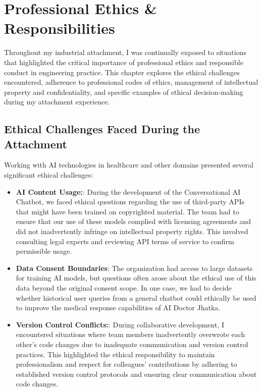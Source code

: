 \documentclass[12pt,a4paper]{article}
\begin{document}
\newpage

\section{Professional Ethics \& Responsibilities}

Throughout my industrial attachment, I was continually exposed to situations that highlighted the critical importance of professional ethics and responsible conduct in engineering practice. This chapter explores the ethical challenges encountered, adherence to professional codes of ethics, management of intellectual property and confidentiality, and specific examples of ethical decision-making during my attachment experience.

\subsection{Ethical Challenges Faced During the Attachment}

Working with AI technologies in healthcare and other domains presented several significant ethical challenges:

\begin{itemize}
    \item \textbf{AI Content Usage:}: During the development of the Conversational AI Chatbot, we faced ethical questions regarding the use of third-party APIs that might have been trained on copyrighted material. The team had to ensure that our use of these models complied with licensing agreements and did not inadvertently infringe on intellectual property rights. This involved consulting legal experts and reviewing API terms of service to confirm permissible usage.
    
    \item \textbf{Data Consent Boundaries}: The organization had access to large datasets for training AI models, but questions often arose about the ethical use of this data beyond the original consent scope. In one case, we had to decide whether historical user queries from a general chatbot could ethically be used to improve the medical response capabilities of AI Doctor Jhatka.
    
    \item \textbf{Version Control Conflicts:}: During collaborative development, I encountered situations where team members inadvertently overwrote each other's code changes due to inadequate communication and version control practices. This highlighted the ethical responsibility to maintain professionalism and respect for colleagues' contributions by adhering to established version control protocols and ensuring clear communication about code changes.
\end{itemize}
\end{document}
